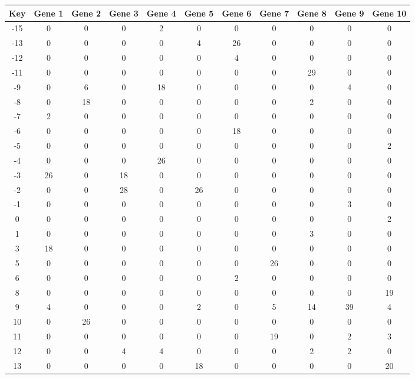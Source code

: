 \begin{tabular}{|c|c|c|c|c|c|c|c|c|c|c|}
\hline
Key & Gene 1 & Gene 2 & Gene 3 & Gene 4 & Gene 5 & Gene 6 & Gene 7 & Gene 8 & Gene 9 & Gene 10 \\
\hline
-15 & 0 & 0 & 0 & 2 & 0 & 0 & 0 & 0 & 0 & 0 \\
-13 & 0 & 0 & 0 & 0 & 4 & 26 & 0 & 0 & 0 & 0 \\
-12 & 0 & 0 & 0 & 0 & 0 & 4 & 0 & 0 & 0 & 0 \\
-11 & 0 & 0 & 0 & 0 & 0 & 0 & 0 & 29 & 0 & 0 \\
-9 & 0 & 6 & 0 & 18 & 0 & 0 & 0 & 0 & 4 & 0 \\
-8 & 0 & 18 & 0 & 0 & 0 & 0 & 0 & 2 & 0 & 0 \\
-7 & 2 & 0 & 0 & 0 & 0 & 0 & 0 & 0 & 0 & 0 \\
-6 & 0 & 0 & 0 & 0 & 0 & 18 & 0 & 0 & 0 & 0 \\
-5 & 0 & 0 & 0 & 0 & 0 & 0 & 0 & 0 & 0 & 2 \\
-4 & 0 & 0 & 0 & 26 & 0 & 0 & 0 & 0 & 0 & 0 \\
-3 & 26 & 0 & 18 & 0 & 0 & 0 & 0 & 0 & 0 & 0 \\
-2 & 0 & 0 & 28 & 0 & 26 & 0 & 0 & 0 & 0 & 0 \\
-1 & 0 & 0 & 0 & 0 & 0 & 0 & 0 & 0 & 3 & 0 \\
0 & 0 & 0 & 0 & 0 & 0 & 0 & 0 & 0 & 0 & 2 \\
1 & 0 & 0 & 0 & 0 & 0 & 0 & 0 & 3 & 0 & 0 \\
3 & 18 & 0 & 0 & 0 & 0 & 0 & 0 & 0 & 0 & 0 \\
5 & 0 & 0 & 0 & 0 & 0 & 0 & 26 & 0 & 0 & 0 \\
6 & 0 & 0 & 0 & 0 & 0 & 2 & 0 & 0 & 0 & 0 \\
8 & 0 & 0 & 0 & 0 & 0 & 0 & 0 & 0 & 0 & 19 \\
9 & 4 & 0 & 0 & 0 & 2 & 0 & 5 & 14 & 39 & 4 \\
10 & 0 & 26 & 0 & 0 & 0 & 0 & 0 & 0 & 0 & 0 \\
11 & 0 & 0 & 0 & 0 & 0 & 0 & 19 & 0 & 2 & 3 \\
12 & 0 & 0 & 4 & 4 & 0 & 0 & 0 & 2 & 2 & 0 \\
13 & 0 & 0 & 0 & 0 & 18 & 0 & 0 & 0 & 0 & 20 \\
\hline
\end{tabular}